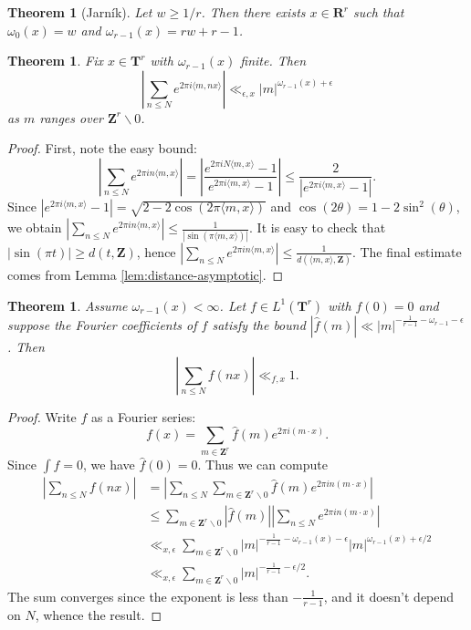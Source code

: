 \documentclass{article}
\newcommand{\bR}{\mathbf{R}}
\newcommand{\bT}{\mathbf{T}}
\newcommand{\bZ}{\mathbf{Z}}
\newtheorem{theorem}[subsection]{Theorem}
\theoremstyle{definition}
\begin{document}
\begin{theorem}[Jarn\'{i}k]\label{thm:existence-exponent}
Let $w\geqslant 1/r$. Then there exists $x\in \bR^r$ such that 
$\omega_0(x)=w$ and $\omega_{r-1}(x)=r w+r-1$. 
\end{theorem}

\begin{theorem}
Fix $x\in \bT^r$ with $\omega_{r-1}(x)$ finite. Then 
\[
	\left| \sum_{n\leqslant N} e^{2\pi i \langle m, nx\rangle}\right| \ll_{\epsilon,x} |m|^{\omega_{r-1}(x)+\epsilon} 
\]
as $m$ ranges over $\bZ^r\smallsetminus 0$. 
\end{theorem}
\begin{proof}
First, note the easy bound:
\[
	\left| \sum_{n\leqslant N} e^{2\pi in\langle m,x\rangle}\right|
		= \left|\frac{e^{2\pi i N \langle m,x\rangle}-1}{e^{2\pi i \langle m,x\rangle}-1}\right| 
		\leqslant \frac{2}{|e^{2\pi i \langle m,x\rangle}-1|} .
\]
Since $|e^{2\pi i \langle m,x\rangle}-1| = \sqrt{2-2\cos(2\pi \langle m,x\rangle)}$ and 
$\cos(2\theta)=1-2\sin^2(\theta)$, we obtain 
$\left|\sum_{n\leqslant N} e^{2\pi i n \langle m,x\rangle}\right| \leqslant \frac{1}{|\sin(\pi \langle m,x\rangle)|}$. 
It is easy to check that $|\sin(\pi t)|\geqslant d(t,\bZ)$, hence 
$\left|\sum_{n\leqslant N} e^{2\pi i n \langle m,x\rangle}\right| \leqslant \frac{1}{d(\langle m,x\rangle,\bZ)}$. 
The final estimate comes from Lemma \ref{lem:distance-asymptotic}. 
\end{proof}

\begin{theorem}\label{thm:hard-sum-bound}
Assume $\omega_{r-1}(x)<\infty$. Let $f\in L^1(\bT^r)$ with 
$\widehat f(0)=0$ and suppose the Fourier coefficients of $f$ satisfy the bound 
$|\widehat f(m)| \ll |m|^{-\frac{1}{r-1}-\omega_{r-1}-\epsilon}$. Then 
\[
	\left|\sum_{n\leqslant N} f(n x)\right| \ll_{f,x} 1 .
\]
\end{theorem}
\begin{proof}
Write $f$ as a Fourier series:
\[
	f(x) = \sum_{m\in \bZ^r} \widehat f(m) e^{2\pi i (m\cdot x)} .
\]
Since $\int f=0$, we have $\widehat f(0)=0$. Thus we can compute 
\begin{align*}
	\left|\sum_{n\leqslant N} f(n x)\right| 
		&= \left| \sum_{n\leqslant N} \sum_{m\in \bZ^r\smallsetminus 0} \widehat f(m) e^{2\pi i n (m\cdot x)} \right| \\
		&\leqslant \sum_{m\in \bZ^r\smallsetminus 0} |\widehat f(m)| \left| \sum_{n\leqslant N} e^{2\pi i n (m\cdot x)}\right| \\
		&\ll_{x,\epsilon} \sum_{m\in \bZ^r\smallsetminus 0} |m|^{-\frac{1}{r-1}-\omega_{r-1}(x)-\epsilon} |m|^{\omega_{r-1}(x)+\epsilon/2} \\
		&\ll_{x,\epsilon} \sum_{m\in \bZ^r\smallsetminus 0} |m|^{-\frac{1}{r-1}-\epsilon/2}.
\end{align*}
The sum converges since the exponent is less than $-\frac{1}{r-1}$, and it 
doesn't depend on $N$, whence the result.
\end{proof}
\end{document}
